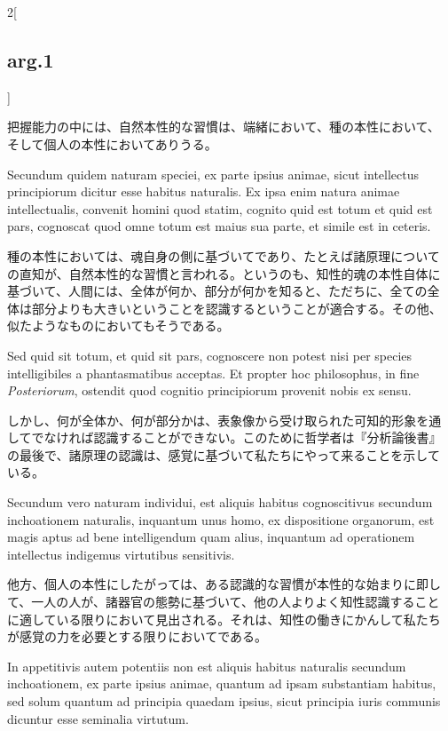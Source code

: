 \documentclass[paper=a4paper,fontsize=10pt,jafontsize=9pt,titlepage]{jlreq}
\begin{document}
\begin{paracol}{2}[\subsection{arg.1}]
\switchcolumn

把握能力の中には、自然本性的な習慣は、端緒において、種の本性において、
そして個人の本性においてありうる。

\switchcolumn*

Secundum quidem naturam speciei, ex parte ipsius animae, sicut
intellectus principiorum dicitur esse habitus naturalis. Ex ipsa enim
natura animae intellectualis, convenit homini quod statim, cognito
quid est totum et quid est pars, cognoscat quod omne totum est maius
sua parte, et simile est in ceteris.

\switchcolumn

種の本性においては、魂自身の側に基づいてであり、たとえば諸原理について
の直知が、自然本性的な習慣と言われる。というのも、知性的魂の本性自体に
基づいて、人間には、全体が何か、部分が何かを知ると、ただちに、全ての全
体は部分よりも大きいということを認識するということが適合する。その他、
似たようなものにおいてもそうである。

\switchcolumn*

Sed quid sit totum, et quid sit pars, cognoscere non potest nisi per
species intelligibiles a phantasmatibus acceptas. Et propter hoc
philosophus, in fine {\itshape Posteriorum}, ostendit quod cognitio
principiorum provenit nobis ex sensu.

\switchcolumn

しかし、何が全体か、何が部分かは、表象像から受け取られた可知的形象を通
してでなければ認識することができない。このために哲学者は『分析論後書』
の最後で、諸原理の認識は、感覚に基づいて私たちにやって来ることを示して
いる。

\switchcolumn*

Secundum vero naturam individui, est aliquis habitus cognoscitivus
secundum inchoationem naturalis, inquantum unus homo, ex dispositione
organorum, est magis aptus ad bene intelligendum quam alius, inquantum
ad operationem intellectus indigemus virtutibus sensitivis.

\switchcolumn

他方、個人の本性にしたがっては、ある認識的な習慣が本性的な始まりに即し
て、一人の人が、諸器官の態勢に基づいて、他の人よりよく知性認識すること
に適している限りにおいて見出される。それは、知性の働きにかんして私たち
が感覚の力を必要とする限りにおいてである。

\switchcolumn*

In appetitivis autem potentiis non est aliquis habitus naturalis
secundum inchoationem, ex parte ipsius animae, quantum ad ipsam
substantiam habitus, sed solum quantum ad principia quaedam ipsius,
sicut principia iuris communis dicuntur esse seminalia virtutum.


\end{paracol}
\end{document}
